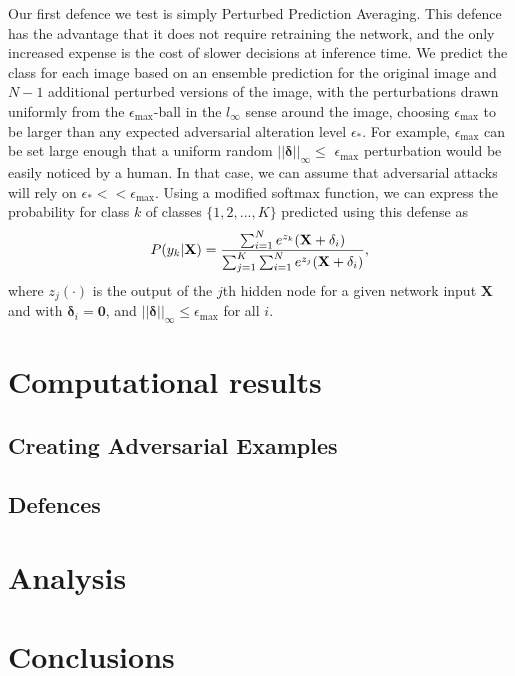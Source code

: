 \documentclass[conference]{IEEEtran}
\begin{document}
Our first defence we test is simply Perturbed Prediction Averaging. This
defence has the advantage that it does not require retraining the network,
and the only increased expense is the cost of slower decisions at inference
time. We predict the class for each image based on an ensemble prediction
for the original image and $N-1$ additional perturbed versions of the image,
with the perturbations drawn uniformly from the $\epsilon _{\max }$-ball in
the $l_{\infty }$ sense around the image, choosing $\epsilon _{\max }$ to be
larger than any expected adversarial alteration level $\epsilon _{\ast }$.
For example, $\epsilon _{\max }$ can be set large enough that a uniform
random $\left\vert \left\vert \mathbf{\delta }\right\vert \right\vert
_{\infty }\leq $ $\epsilon _{\max }$ perturbation would be easily noticed by
a human. In that case, we can assume that adversarial attacks will rely on $%
\epsilon _{\ast }<<\epsilon _{\max }$. Using a modified softmax function, we
can express the probability for class $k$ of classes $\{1,2,...,K\}$
predicted using this defense as%
\[
P(y_{k}\rvert \mathbf{X})=\frac{\sum_{i=1}^{N}e^{z_{k}}(\mathbf{X}+\mathbf{%
\delta }_{i}\mathbf{)}}{\sum_{j=1}^{K}\sum_{i=1}^{N}e^{z_{j}}(\mathbf{X}+%
\mathbf{\delta }_{i}\mathbf{)}},
\]%
where $z_{j}(\cdot )$ is the output of the $j$th hidden node for a given
network input $\mathbf{X}$ and with $\mathbf{\delta }_{i}=\mathbf{0}$, and $%
\left\vert \left\vert \mathbf{\delta }\right\vert \right\vert _{\infty }\leq
\epsilon _{\max }$ for all $i$.

\section{Computational results}

\subsection{Creating Adversarial Examples}

\subsection{Defences}

\section{Analysis}

\section{Conclusions}



\end{document}
